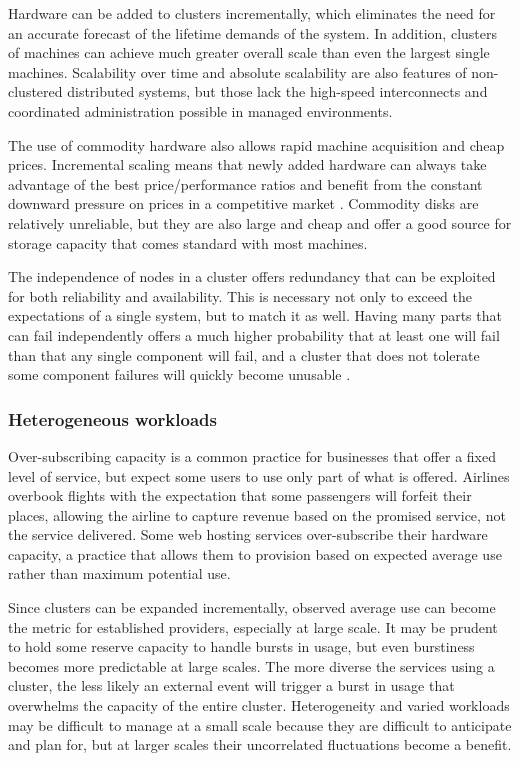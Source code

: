 Hardware can be added to clusters incrementally, which eliminates the need for an accurate forecast of the lifetime demands of the system. In addition, clusters of machines can achieve much greater overall scale than even the largest single machines. Scalability over time and absolute scalability are also features of non-clustered distributed systems, but those lack the high-speed interconnects and coordinated administration possible in managed environments.

The use of commodity hardware also allows rapid machine acquisition and cheap prices. Incremental scaling means that newly added hardware can always take advantage of the best price/performance ratios and benefit from the constant downward pressure on prices in a competitive market \cite{fox}. Commodity disks are relatively unreliable, but they are also large and cheap and offer a good source for storage capacity \cite{patterson,warfield} that comes standard with most machines.

The independence of nodes in a cluster offers redundancy that can be exploited for both reliability and availability. This is necessary not only to exceed the expectations of a single system, but to match it as well. Having many parts that can fail independently offers a much higher probability that at least one will fail than that any single component will fail, and a cluster that does not tolerate some component failures will quickly become unusable \cite{birrell93}.

\subsubsection{Heterogeneous workloads}

Over-subscribing capacity is a common practice for businesses that offer a fixed level of service, but expect some users to use only part of what is offered. Airlines overbook flights with the expectation that some passengers will forfeit their places, allowing the airline to capture revenue based on the promised service, not the service delivered. Some web hosting services over-subscribe their hardware capacity, a practice that allows them to provision based on expected average use rather than maximum potential use.

Since clusters can be expanded incrementally, observed average use can become the metric for established providers, especially at large scale. It may be prudent to hold some reserve capacity to handle bursts in usage, but even burstiness becomes more predictable at large scales. The more diverse the services using a cluster, the less likely an external event will trigger a burst in usage that overwhelms the capacity of the entire cluster. Heterogeneity and varied workloads may be difficult to manage at a small scale because they are difficult to anticipate and plan for, but at larger scales their uncorrelated fluctuations become a benefit.

